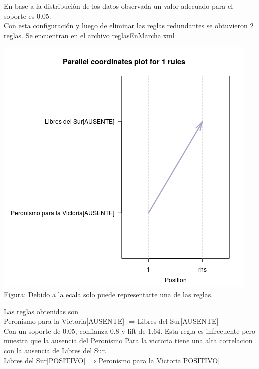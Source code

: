 \documentclass{endm}
\begin{document}
En base a la distribución de los datos observada un valor adecuado para el soporte es 0.05.\\

Con esta configuración y luego de eliminar las reglas redundantes se obtuvieron 2 reglas. Se encuentran en el archivo reglasEnMarcha.xml  \\

\begin{center}
\includegraphics[scale=0.4]{graficos/paracoordEnMarcha.png} \\
\scriptsize{Figura: Debido a la ecala solo puede representarte una de las reglas.}
\end{center}

Las reglas obtenidas son \\

{Peronismo para la Victoria[AUSENTE]} $\Longrightarrow${Libres del Sur[AUSENTE]}  \\ 

Con un soporte  de 0.05, confianza 0.8 y lift de 1.64. Esta regla es infrecuente pero muestra que la ausencia del Peronismo Para la victoria tiene una alta correlacion con la ausencia de Libres del Sur. \\ 

{Libres del Sur[POSITIVO]}  $\Longrightarrow${Peronismo para la Victoria[POSITIVO]} \\ 
\end{document}

